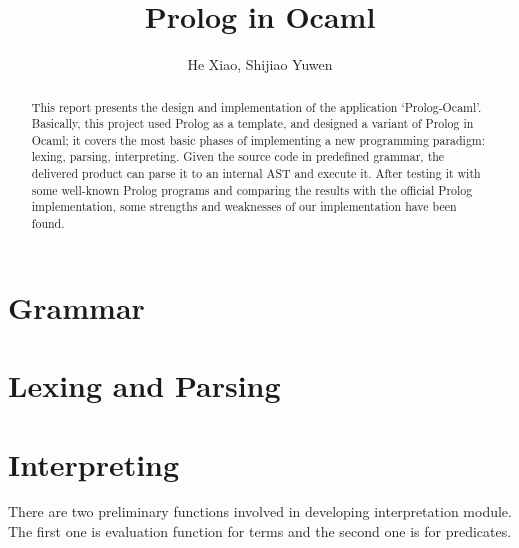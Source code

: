 \documentclass[11pt,a4paper]{report}
\author{He Xiao, Shijiao Yuwen}
\title{Prolog in Ocaml}
\begin{document}
	\maketitle
	
\begin{abstract}
	This report presents the design and implementation of the application `Prolog-Ocaml'.
	Basically, this project used Prolog as a template, and designed a variant of Prolog in Ocaml;
	it covers the most basic phases of implementing a new programming paradigm: lexing, parsing, interpreting.
	Given the source code in predefined grammar, the delivered product can parse it to an internal AST and execute
	it. After testing it with some well-known Prolog programs and comparing the results with the official Prolog implementation,
	some strengths and weaknesses of our implementation have been found.  
\end{abstract}

\section*{Grammar}


\section*{Lexing and Parsing}



\section*{Interpreting}
There are two preliminary functions involved in developing interpretation module. The first one is evaluation function for terms and the second one is for predicates.\\
\end{document}
